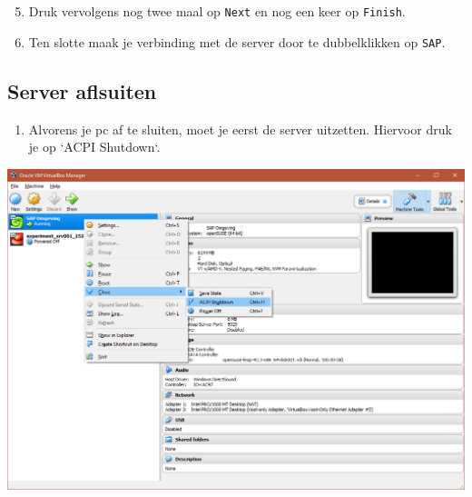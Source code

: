 \documentclass[a4paper, 11pt]{article}
\providecommand{\tightlist}{%
    \setlength{\itemsep}{0pt}
    \setlength{\parskip}{0pt}
}
\begin{document}
\begin{enumerate}
\setcounter{enumi}{4}
\tightlist
\item
  Druk vervolgens nog twee maal op \texttt{Next} en nog een keer op
  \texttt{Finish}.
\item
  Ten slotte maak je verbinding met de server door te dubbelklikken op
  \texttt{SAP}.
\end{enumerate}

\subsection{Server aflsuiten}

\begin{enumerate}
 \item 
  Alvorens je pc af te sluiten, moet je eerst de server uitzetten. Hiervoor druk je op `ACPI Shutdown`.
\end{enumerate}
\begin{center}
    \includegraphics[scale=0.68,center]{img/shutdown.png}
\end{center}
\end{document}
